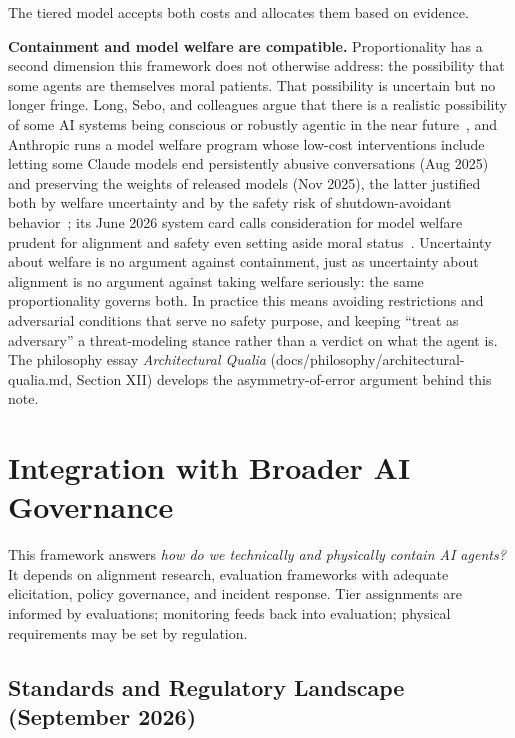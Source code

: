 \documentclass[11pt,letterpaper]{article}
\begin{document}
The tiered model accepts both costs and allocates them based on evidence.

\textbf{Containment and model welfare are compatible.} Proportionality has a second dimension this framework does not otherwise address: the possibility that some agents are themselves moral patients. That possibility is uncertain but no longer fringe. Long, Sebo, and colleagues argue that there is a realistic possibility of some AI systems being conscious or robustly agentic in the near future~\cite{aiwelfare}, and Anthropic runs a model welfare program whose low-cost interventions include letting some Claude models end persistently abusive conversations (Aug 2025) and preserving the weights of released models (Nov 2025), the latter justified both by welfare uncertainty and by the safety risk of shutdown-avoidant behavior~\cite{anthropicwelfare}; its June 2026 system card calls consideration for model welfare prudent for alignment and safety even setting aside moral status~\cite{fable5card}. Uncertainty about welfare is no argument against containment, just as uncertainty about alignment is no argument against taking welfare seriously: the same proportionality governs both. In practice this means avoiding restrictions and adversarial conditions that serve no safety purpose, and keeping ``treat as adversary'' a threat-modeling stance rather than a verdict on what the agent is. The philosophy essay \emph{Architectural Qualia} (docs/philosophy/architectural-qualia.md, Section XII) develops the asymmetry-of-error argument behind this note.


\section{Integration with Broader AI Governance}
\label{sec:governance}

This framework answers \emph{how do we technically and physically contain AI agents?} It depends on alignment research, evaluation frameworks with adequate elicitation, policy governance, and incident response. Tier assignments are informed by evaluations; monitoring feeds back into evaluation; physical requirements may be set by regulation.

\subsection{Standards and Regulatory Landscape (September 2026)}
\end{document}
